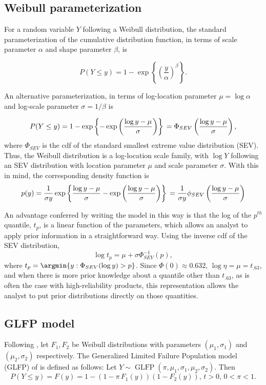 \documentclass[12pt]{article}
\newcommand{\op}{\operatorname}
\begin{document}
\subsection{Weibull parameterization}
\label{sec:Weibull parameterization}
For a random variable $Y$ following a Weibull distribution, the standard parameterization of the cumulative distribution function, in terms of scale parameter $\alpha$ and shape parameter $\beta$, is

$$ P(Y \le y) = 1 - \exp \left\{ \left( \frac{y}{\alpha} \right)^\beta \right\}. $$

An alternative parameterization, in terms of log-location parameter $\mu = \log \alpha$ and log-scale parameter $\sigma = 1/\beta$ is

\begin{equation} P(Y \le y) = 1 - \exp \left\{ -\exp \left( \frac{ \log y - \mu }{\sigma} \right) \right\}\\
= \Phi_{SEV}\left(\frac{\log y - \mu}{\sigma}\right),
\end{equation}
where $\Phi_{SEV}$ is the cdf of the standard smallest extreme value distribution (SEV). Thus, the Weibull distribution is a log-location scale family, with $\log Y$ following an SEV distribution with location parameter $\mu$ and scale parameter $\sigma$. With this in mind, the corresponding density function is
\begin{equation}
p(y) = \frac{1}{\sigma y}\exp\left\{\frac{\log y - \mu}{\sigma} - \exp \left( \frac{\log y - \mu}{\sigma} \right)\right\}\\
=\frac{1}{\sigma y} \phi_{SEV}\left(\frac{\log y - \mu}{\sigma}\right)
\end{equation}

An advantage conferred by writing the model in this way is that the log of the $p^{th}$ quantile, $t_p$, is a linear function of the parameters, which allows an analyst to apply prior information in a straightforward way.  Using the inverse cdf of the SEV distribution,
\begin{equation}
\log t_p = \mu + \sigma \Phi_{SEV}^{-1}(p),
\end{equation}
where $t_p = \argmin\{y:\Phi_{SEV}(\log y)>p\}$. Since $\Phi(0)\approx 0.632$, $\log{\eta} = \mu  =t_{.63}$, and when there is more prior knowledge about a quantile other than $t_{.63}$, as is often the case with high-reliability products,  this representation allows the analyst to put prior distributions directly on those quantities.


\subsection{GLFP model}
\label{subsec:GLFP model}
Following \cite{chan}, let $F_1,F_2$ be Weibull distributions with parameters $(\mu_1,\sigma_1)$ and $(\mu_2, \sigma_2)$ respectively.
The Generalized Limited Failure Population model (GLFP) of \citet{chan} is defined as follows: Let $Y \sim \op{GLFP}(\pi, \mu_1,\sigma_1,\mu_2,\sigma_2)$. Then
$$P(Y \le y) = F(y) = 1 - (1-\pi\, F_{1}(y))(1 - F_{2}(y)),\, t>0,\, 0 < \pi < 1.$$
\end{document}
